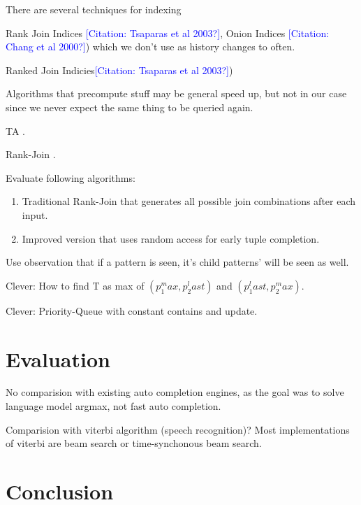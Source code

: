 \documentclass[m,bachelor,binding]{WeSTthesis}
\newcommand{\mbref}[1]{\textcolor{blue}{\footnotesize[Citation: #1?]}}
\begin{document}
There are several techniques for indexing {Rank Join Indices \mbref{Tsaparas et
al 2003}, Onion Indices \mbref{Chang et al 2000}) which we don't use as history
changes to often.

Ranked Join Indicies\mbref{Tsaparas et al 2003})

Algorithms that precompute stuff may be general speed up, but not in our case
since we never expect the same thing to be queried again.

TA \parencite{Fagin2001}.

Rank-Join \parencite{Ilyas2004}.

Evaluate following algorithms:

\begin{enumerate}
  \item Traditional Rank-Join that generates all possible join combinations
    after each input.
  \item Improved version that uses random access for early tuple completion.
\end{enumerate}

Use observation that if a pattern is seen, it's child patterns' will be seen as
well.

Clever: How to find T as max of $(p_1^max, p_2^last)$ and $(p_1^last, p_2^max)$.

Clever: Priority-Queue with constant contains and update.

\chapter{Evaluation}

No comparision with existing auto completion engines, as the goal was to solve
language model argmax, not fast auto completion.

Comparision with viterbi algorithm (speech recognition)?
Most implementations of viterbi are beam search or time-synchonous beam search.

\chapter{Conclusion}

\printbibliography[heading=bibintoc]

\begin{appendices}


\end{appendices}}
\end{document}
